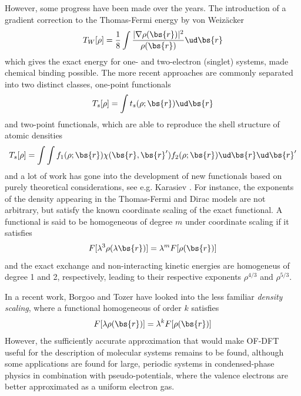 However, some progress have been made over the years. The introduction of a gradient correction to the 
Thomas-Fermi energy by von Weiz\"{a}cker\cite{vonWeizacker:1935}
\begin{equation}
    \label{eq:vonWeizacker}
    T_W[\rho] = \frac{1}{8}\int\frac{|\nabla\rho(\bs{r})|^2}{\rho(\bs{r})}\ud\bs{r}
\end{equation}
which gives the exact energy for one- and two-electron (singlet) systems, made chemical binding possible. The more 
recent approaches are commonly separated into two distinct classes, one-point functionals
\begin{equation}
    T_s[\rho] = \int t_s(\rho;\bs{r})\ud\bs{r}
\end{equation}
and two-point functionals, which are able to reproduce the shell structure of atomic densities\cite{Wang:1992}
\begin{equation}
    T_s[\rho] = \int\int f_1(\rho;\bs{r})\chi(\bs{r},\bs{r}')f_2(\rho;\bs{r})\ud\bs{r}\ud\bs{r}'
\end{equation}
and a lot of work has gone into the development of new functionals based on purely theoretical 
considerations, see e.g. Karasiev \etal\cite{Karasiev:2009}. For 
instance, the exponents of the density appearing in the Thomas-Fermi and Dirac models are not arbitrary, but satisfy
the known coordinate scaling of the exact functional. A functional is said to be homogeneous of degree $m$ under
coordinate scaling if it satisfies
\begin{equation}
    F[\lambda^3\rho(\lambda\bs{r})] = \lambda^mF[\rho(\bs{r})]
\end{equation}
and the exact exchange and non-interacting kinetic energies are homogeneus of degree 1 and 2, respectively, leading 
to their respective exponents $\rho^{4/3}$ and $\rho^{5/3}$. 

In a recent work, Borgoo and Tozer\cite{Borgoo:2013} have looked
into the less familiar \emph{density scaling}, where a functional homogeneous of order $k$ satisfies
\begin{equation}
    F[\lambda\rho(\bs{r})] = \lambda^kF[\rho(\bs{r})]
\end{equation}
However, the sufficiently accurate approximation that would make OF-DFT useful for the description of molecular
systems remains to be found\cite{Xia:2012}, although some applications are found for large, periodic systems in 
condensed-phase physics in combination with pseudo-potentials, where the valence electrons are better 
approximated as a uniform electron gas\cite{Hung:2009,Huang:2010}.

